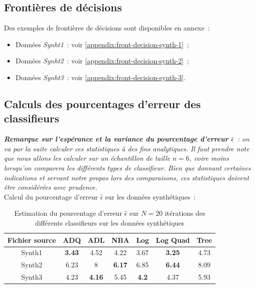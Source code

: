 \documentclass[a4paper,10pt]{report}
\begin{document}
\subsection{Frontières de décisions}

Des exemples de frontières de décisions sont disponibles en annexe~:
\begin{itemize}
	\item Données \textit{Synht1}~: voir \autoref{appendix:front-decision-synth-1}~;
	\item Données \textit{Synht2}~: voir \autoref{appendix:front-decision-synth-2}~;
	\item Données \textit{Synht3}~: voir \autoref{appendix:front-decision-synth-3}.
\end{itemize}



\subsection{Calculs des pourcentages d'erreur des classifieurs}

\textit{\textbf{Remarque sur l'espérance et la variance du pourcentage d'erreur $\hat{\epsilon}$}~: on va par la suite calculer ces statistiques à des fins analytiques. Il faut prendre note que nous allons les calculer sur un échantillon de taille $n=6$, voire moins lorsqu'on comparera les différents types de classifieur. Bien que donnant certaines indications et servant notre propos lors des comparaisons, ces statistiques doivent être considérées avec prudence.}\\

Calcul du pourcentage d'erreur $\hat{\epsilon}$ sur les données synthétiques~:
\begin{table}[H]
	\centering
	\captionsetup{justification=centering, margin=4cm}
	\begin{tabular}{c|c|c|c|c|c|c}
		Fichier source & ADQ & ADL & NBA & Log & Log Quad & Tree \\ 
		\hline
		Synth1 & \textbf{3.43}  & 4.52  & 4.22  & 3.67  & \textbf{3.25}  & 4.73  \\ 
		Synth2 & 6.23  & 8  & \textbf{6.17}  & 6.85  & \textbf{6.44}  & 8.09  \\ 
		Synth3 & 4.23  & \textbf{4.16}  & 5.45  & \textbf{4.2}  & 4.37  & 5.93   \\ 
	\end{tabular}
	\caption{\small Estimation du pourcentage d'erreur $\hat{\epsilon}$ sur $N=20$ itérations des différents classifieurs sur les données synthétiques}
	\label{table:2-1-erreur-data-synth}
\end{table}
\end{document}

